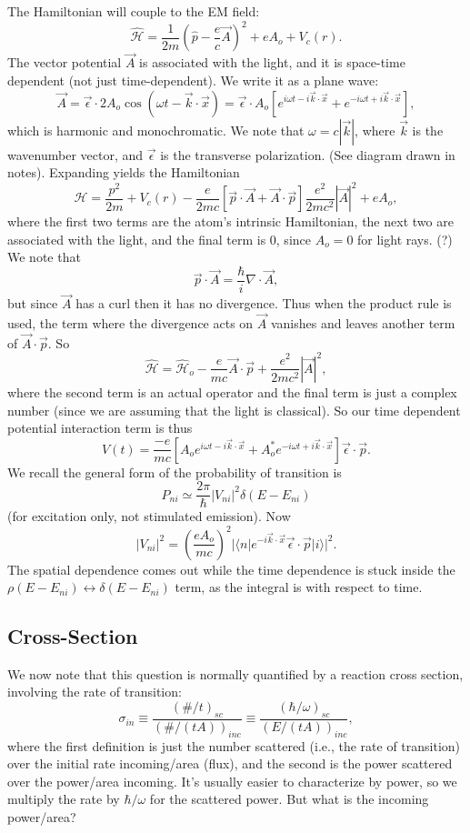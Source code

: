 \documentclass[fontsize=12pt]{scrartcl}
\newcommand{\la}{\langle}
\newcommand{\ra}{\rangle}
\newcommand{\mom}{\hat{p}}
\newcommand{\Ham}{\hat{\mathcal{H}}}
\begin{document}
The Hamiltonian will couple to the EM field: $$\Ham= \frac{1}{2m}(\mom-\frac{e}{c}\vec{A})^2 + eA_o + V_c(r).$$ The vector potential $\vec{A}$ is associated with the light, and it is space-time dependent (not just time-dependent). We write it as a plane wave: $$\vec{A}=\vec{\epsilon}\cdot 2A_o\cos(\omega t-\vec{k}\cdot\vec{x})=\vec{\epsilon}\cdot A_o\left[e^{i\omega t-i\vec{k}\cdot\vec{x}}+e^{-i\omega t+i\vec{k}\cdot\vec{x}}\right],$$ which is harmonic and monochromatic. We note that $\omega=c|\vec{k}|$, where $\vec{k}$ is the wavenumber vector, and $\vec{\epsilon}$ is the transverse polarization. (See diagram drawn in notes). Expanding yields the Hamiltonian $$\Ham = \frac{p^2}{2m}+V_c(r)-\frac{e}{2mc}\left[\vec{p}\cdot\vec{A}+\vec{A}\cdot\vec{p}\right] \frac{e^2}{2mc^2}|\vec{A}|^2+eA_o,$$ where the first two terms are the atom's intrinsic Hamiltonian, the next two are associated with the light, and the final term is 0, since $A_o=0$ for light rays. (?) We note that $$\vec{p}\cdot\vec{A}=\frac{\hbar}{i}\nabla\cdot\vec{A},$$ but since $\vec{A}$ has a curl then it has no divergence. Thus when the product rule is used, the term where the divergence acts on $\vec{A}$ vanishes and leaves another term of $\vec{A}\cdot\vec{p}$. So $$\Ham=\Ham_o-\frac{e}{mc}\vec{A}\cdot\vec{p} +\frac{e^2}{2mc^2}|\vec{A}|^2,$$ where the second term is an actual operator and the final term is just a complex number (since we are assuming that the light is classical). So our time dependent potential interaction term is thus $$V(t)=\frac{-e}{mc}\left[A_oe^{i\omega t-i\vec{k}\cdot\vec{x}}+A_o^* e^{-i\omega t+i\vec{k}\cdot\vec{x}}\right]\vec{\epsilon}\cdot\vec{p}.$$ We recall the general form of the probability of transition is $$P_{ni}\simeq \frac{2\pi}{\hbar}|V_{ni}|^2\delta(E-E_{ni})$$ (for excitation only, not stimulated emission). Now $$|V_{ni}|^2 = \left(\frac{eA_o}{mc}\right)^2 |\la n |e^{-i\vec{k}\cdot\vec{x}}\vec{\epsilon}\cdot\vec{p}|i\ra|^2.$$ The spatial dependence comes out while the time dependence is stuck inside the $\rho(E-E_{ni})\leftrightarrow \delta(E-E_{ni})$ term, as the integral is with respect to time.

\subsection{Cross-Section}
We now note that this question is normally quantified by a reaction cross section, involving the rate of transition: $$\sigma_{in}\equiv\frac{(\#/t)_{sc}}{(\#/(tA))_{inc}}\equiv \frac{(\hbar/\omega)_{sc}}{(E/(tA))_{inc}},$$ where the first definition is just the number scattered (i.e., the rate of transition) over the initial rate incoming/area (flux), and the second is the power scattered over the power/area incoming. It's usually easier to characterize by power, so we multiply the rate by $\hbar/\omega$ for the scattered power. But what is the incoming power/area?
\end{document}
